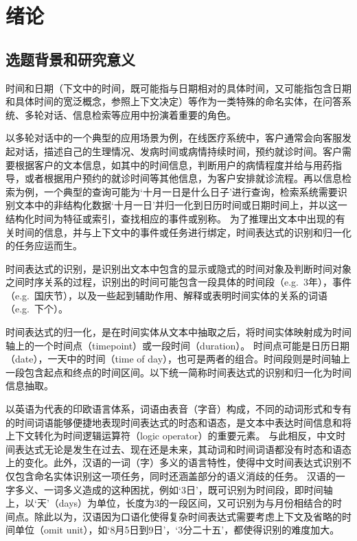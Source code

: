 
\chapter{绪论}

\section{选题背景和研究意义}

时间和日期（下文中的时间，既可能指与日期相对的具体时间，又可能指包含日期和具体时间的宽泛概念，参照上下文决定）等作为一类特殊的命名实体，在问答系统、多轮对话、信息检索等应用中扮演着重要的角色。

以多轮对话中的一个典型的应用场景为例，在线医疗系统中，客户通常会向客服发起对话，描述自己的生理情况、发病时间或病情持续时间，预约就诊时间。客户需要根据客户的文本信息，如其中的时间信息，判断用户的病情程度并给与用药指导，或者根据用户预约的就诊时间等其他信息，为客户安排就诊流程。再以信息检索为例，一个典型的查询可能为‘十月一日是什么日子’进行查询，检索系统需要识别文本中的非结构化数据‘十月一日’并归一化到日历时间或日期时间上，并以这一结构化时间为特征或索引，查找相应的事件或别称。
为了推理出文本中出现的有关时间的信息，并与上下文中的事件或任务进行绑定，时间表达式的识别和归一化的任务应运而生。

时间表达式的识别，是识别出文本中包含的显示或隐式的时间对象及判断时间对象之间时序关系的过程，识别出的时间可能包含一段具体的时间段（e.g.\ 3年），事件（e.g.\ 国庆节），以及一些起到辅助作用、解释或表明时间实体的关系的词语（e.g.\ 下个）。

时间表达式的归一化，是在时间实体从文本中抽取之后，将时间实体映射成为时间轴上的一个时间点（timepoint）或一段时间（duration）。
时间点可能是日历日期（date），一天中的时间（time of day），也可是两者的组合。时间段则是时间轴上一段包含起点和终点的时间区间。以下统一简称时间表达式的识别和归一化为时间信息抽取。

以英语为代表的印欧语言体系，词语由表音（字音）构成，不同的动词形式和专有的时间词语能够便捷地表现时间表达式的时态和语态，是文本中表达时间信息和将上下文转化为时间逻辑运算符（logic operator）的重要元素。
与此相反，中文时间表达式无论是发生在过去、现在还是未来，其动词和时间词语都没有时态和语态上的变化。此外，汉语的一词（字）多义的语言特性，使得中文时间表达式识别不仅包含命名实体识别这一项任务，同时还涵盖部分的语义消歧的任务。
汉语的一字多义、一词多义造成的这种困扰，例如‘3日’，既可识别为时间段，即时间轴上，以‘天’（days）为单位，长度为3的一段区间，又可识别为与月份相结合的时间点。除此以为，汉语因为口语化使得复杂时间表达式需要考虑上下文及省略的时间单位（omit unit），如‘8月5日到9日’，‘3分二十五’，都使得识别的难度加大。

